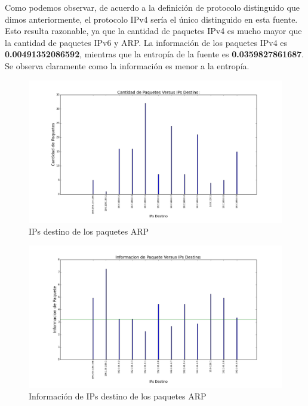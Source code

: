 Como podemos observar, de acuerdo a la definición de protocolo distinguido que dimos anteriormente, el protocolo IPv4 sería el único distinguido en esta fuente. Esto resulta razonable, ya que la cantidad de paquetes IPv4 es mucho mayor que la cantidad de paquetes IPv6 y ARP. La información de los paquetes IPv4 es \textbf{0.00491352086592}, mientras que la entropía de la fuente es \textbf{0.0359827861687}. Se observa claramente como la información es menor a la entropía.


\begin{figure}[H]
       \centering
       \includegraphics[width=1\textwidth]{../resultados/Casa/histogram_dst.png}
       \caption{IPs destino de los paquetes ARP}
       \label{red-hogarena-arp-destination}
\end{figure}

\begin{figure}[H]
       \centering
       \includegraphics[width=1\textwidth]{../resultados/Casa/histogram_dst_information.png}
       \caption{Información de IPs destino de los paquetes ARP}
       \label{red-hogarena-arp-destination-info}
\end{figure}

